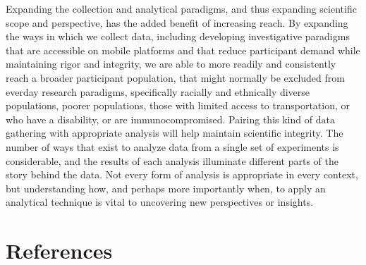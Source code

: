 \documentclass[
  english,
  man,floatsintext]{apa6}
\begin{document}
Expanding the collection and analytical paradigms, and thus expanding scientific scope and perspective, has the added benefit of increasing reach. By expanding the ways in which we collect data, including developing investigative paradigms that are accessible on mobile platforms and that reduce participant demand while maintaining rigor and integrity, we are able to more readily and consistently reach a broader participant population, that might normally be excluded from everday research paradigms, specifically racially and ethnically diverse populations, poorer populations, those with limited access to transportation, or who have a disability, or are immunocompromised. Pairing this kind of data gathering with appropriate analysis will help maintain scientific integrity. The number of ways that exist to analyze data from a single set of experiments is considerable, and the results of each analysis illuminate different parts of the story behind the data. Not every form of analysis is appropriate in every context, but understanding how, and perhaps more importantly when, to apply an analytical technique is vital to uncovering new perspectives or insights.

\newpage

\hypertarget{references}{%
\section{References}\label{references}}

\begingroup
\setlength{\parindent}{-0.5in}
\setlength{\leftskip}{0.5in}
\end{document}
